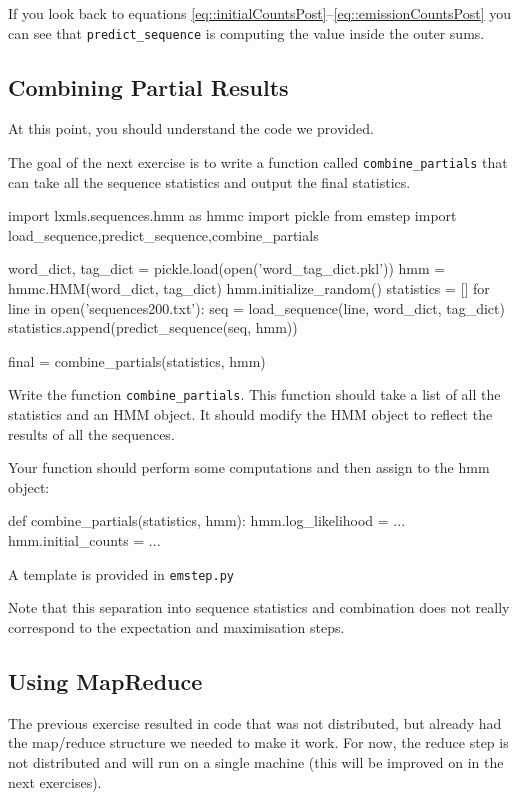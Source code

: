 If you look back to equations \eqref{eq::initialCountsPost}--\eqref{eq::emissionCountsPost} you can see that
\verb+predict_sequence+ is computing the value inside the outer sums.

\subsection{Combining Partial Results}
\label{beginMR}
At this point, you should understand the code we provided.

The goal of the next exercise is to write a function called \verb+combine_partials+
that can take all the sequence statistics and output the final statistics.

\begin{python}
import lxmls.sequences.hmm as hmmc
import pickle
from emstep import load_sequence,predict_sequence,combine_partials

word_dict, tag_dict = pickle.load(open('word_tag_dict.pkl'))
hmm = hmmc.HMM(word_dict, tag_dict)
hmm.initialize_random()
statistics = []
for line in open('sequences200.txt'):
    seq = load_sequence(line, word_dict, tag_dict)
    statistics.append(predict_sequence(seq, hmm))

final = combine_partials(statistics, hmm)
\end{python}

\begin{exercise}
Write the function \verb+combine_partials+. This function should take a list of all
the statistics and an HMM object. It should modify the HMM object to reflect
the results of all the sequences.

Your function should perform some computations and then assign to the hmm object:

\begin{python}
def combine_partials(statistics, hmm):
    hmm.log_likelihood = ...
    hmm.initial_counts = ...
\end{python}

A template is provided in \verb+emstep.py+
\end{exercise}

Note that this separation into sequence statistics and combination does not
really correspond to the expectation and maximisation steps.

\subsection{Using MapReduce}
The previous exercise resulted in code that was not distributed, but already
had the map/reduce structure we needed to make it work. For now, the reduce step is not
distributed and will run on a single machine (this will be improved on in the
next exercises).


